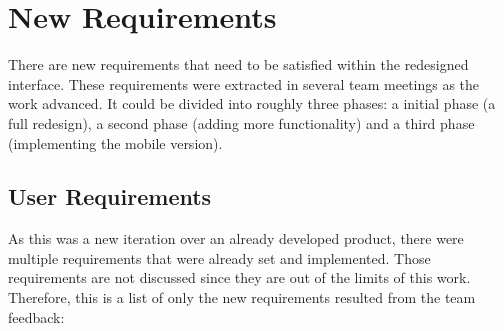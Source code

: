 \section{New Requirements} %
\label{sec:new_requirements}

There are new requirements that need to be satisfied within the redesigned  interface.
These requirements were extracted in several team meetings as the work advanced.
It could be divided into roughly three phases: a initial phase (a full redesign), a second phase (adding more functionality) and a third phase (implementing the mobile version).

\subsection{User Requirements} %
\label{sub:user_requirements}

As this was a new iteration over an already developed product, there were multiple requirements that were already set and implemented.
Those requirements are not discussed since they are out of the limits of this work.
Therefore, this is a list of only the new requirements resulted from the team feedback:

\begin{center}
  \begin{userrequirement}
    \label{tab:requirementredesign}%
  \end{userrequirement}
\end{center}

\begin{center}
  \begin{userrequirement}
    \label{tab:requirementreadapt}%
  \end{userrequirement}
\end{center}

\begin{center}
  \begin{userrequirement}
    \label{tab:requirementdevicename}%
  \end{userrequirement}
\end{center}

